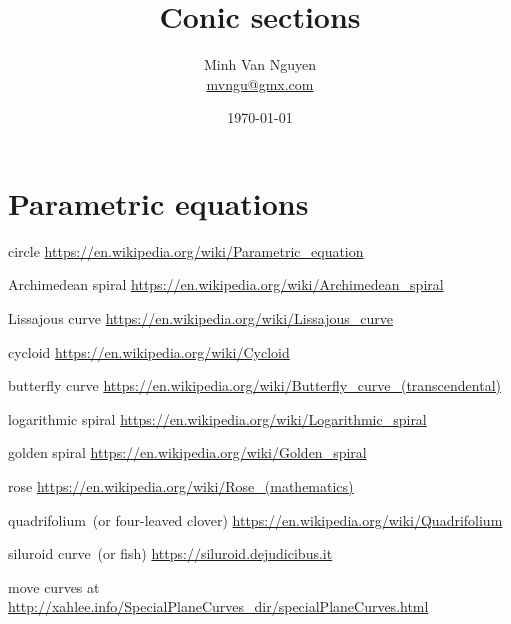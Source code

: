 \documentclass[a4paper,oneside,12pt]{article}
\begin{document}
\title{\Large\bf Conic sections}
\author{%
  Minh Van Nguyen \\
  \url{mvngu@gmx.com}
}
\date{\today}
\maketitle



\section{Parametric equations}

{\color{red}
\begin{packeditem}
\item circle
  \url{https://en.wikipedia.org/wiki/Parametric_equation}

\item Archimedean spiral
  \url{https://en.wikipedia.org/wiki/Archimedean_spiral}

\item Lissajous curve
  \url{https://en.wikipedia.org/wiki/Lissajous_curve}

\item cycloid
  \url{https://en.wikipedia.org/wiki/Cycloid}

\item butterfly curve
  \url{https://en.wikipedia.org/wiki/Butterfly_curve_(transcendental)}

\item logarithmic spiral
  \url{https://en.wikipedia.org/wiki/Logarithmic_spiral}

\item golden spiral
  \url{https://en.wikipedia.org/wiki/Golden_spiral}

\item rose
  \url{https://en.wikipedia.org/wiki/Rose_(mathematics)}

\item quadrifolium~(or four-leaved clover)
  \url{https://en.wikipedia.org/wiki/Quadrifolium}

\item siluroid curve~(or fish)
  \url{https://siluroid.dejudicibus.it}

\item move curves at
  \url{http://xahlee.info/SpecialPlaneCurves_dir/specialPlaneCurves.html}
\end{packeditem}
}


\end{document}

